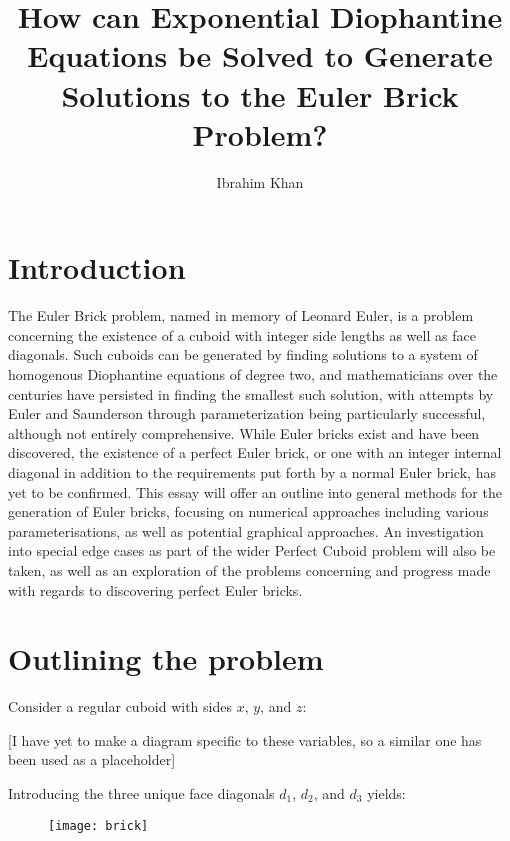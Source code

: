 \documentclass[11pt]{article}
\title{\textbf{How can Exponential Diophantine Equations be Solved to Generate Solutions to the Euler Brick Problem?}}
\author{Ibrahim Khan}
\date{}
\begin{document}
\maketitle
\newpage
\tableofcontents
\newpage
\section{Introduction}
The Euler Brick problem, named in memory of Leonard Euler, is a problem concerning the existence of a cuboid with integer side lengths as well as face diagonals. Such cuboids can be generated by finding solutions to a system of homogenous Diophantine equations of degree two, and mathematicians over the centuries have persisted in finding the smallest such solution, with attempts by Euler and Saunderson through parameterization being particularly successful, although not entirely comprehensive. While Euler bricks exist and have been discovered, the existence of a perfect Euler brick, or one with an integer internal diagonal in addition to the requirements put forth by a normal Euler brick, has yet to be confirmed. This essay will offer an outline into general methods for the generation of Euler bricks, focusing on numerical approaches including various parameterisations, as well as potential graphical approaches. An investigation into special edge cases as part of the wider Perfect Cuboid problem will also be taken, as well as an exploration of the problems concerning and progress made with regards to discovering perfect Euler bricks.


\section{Outlining the problem}
Consider a regular cuboid with sides $x$, $y$, and $z$:

[I have yet to make a diagram specific to these variables, so a similar one has been used as a placeholder]

Introducing the three unique face diagonals $d_1$, $d_2$, and $d_3$ yields:
\begin{figure}[h]
\texttt{[image: brick]}
\end{figure}
\end{document}
